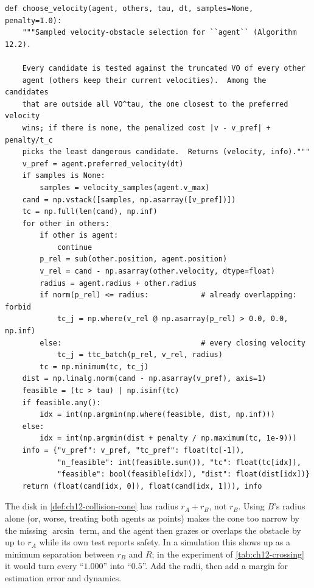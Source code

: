 \begin{lstlisting}[caption={Sampled velocity selection (from \code{code/ch12\_velocity\_obstacles.py}); this is \cref{alg:ch12-choose}.},label={lst:ch12-choose}]
def choose_velocity(agent, others, tau, dt, samples=None, penalty=1.0):
    """Sampled velocity-obstacle selection for ``agent`` (Algorithm 12.2).

    Every candidate is tested against the truncated VO of every other
    agent (others keep their current velocities).  Among the candidates
    that are outside all VO^tau, the one closest to the preferred velocity
    wins; if there is none, the penalized cost |v - v_pref| + penalty/t_c
    picks the least dangerous candidate.  Returns (velocity, info)."""
    v_pref = agent.preferred_velocity(dt)
    if samples is None:
        samples = velocity_samples(agent.v_max)
    cand = np.vstack([samples, np.asarray([v_pref])])
    tc = np.full(len(cand), np.inf)
    for other in others:
        if other is agent:
            continue
        p_rel = sub(other.position, agent.position)
        v_rel = cand - np.asarray(other.velocity, dtype=float)
        radius = agent.radius + other.radius
        if norm(p_rel) <= radius:            # already overlapping: forbid
            tc_j = np.where(v_rel @ np.asarray(p_rel) > 0.0, 0.0, np.inf)
        else:                                # every closing velocity
            tc_j = ttc_batch(p_rel, v_rel, radius)
        tc = np.minimum(tc, tc_j)
    dist = np.linalg.norm(cand - np.asarray(v_pref), axis=1)
    feasible = (tc > tau) | np.isinf(tc)
    if feasible.any():
        idx = int(np.argmin(np.where(feasible, dist, np.inf)))
    else:
        idx = int(np.argmin(dist + penalty / np.maximum(tc, 1e-9)))
    info = {"v_pref": v_pref, "tc_pref": float(tc[-1]),
            "n_feasible": int(feasible.sum()), "tc": float(tc[idx]),
            "feasible": bool(feasible[idx]), "dist": float(dist[idx])}
    return (float(cand[idx, 0]), float(cand[idx, 1])), info
\end{lstlisting}

\begin{pitfall}
The disk in \cref{def:ch12-collision-cone} has radius $r_A + r_B$, not $r_B$.
Using $B$'s radius alone (or, worse, treating both agents as points) makes the
cone too narrow by the missing $\arcsin$ term, and the agent then grazes or
overlaps the obstacle by up to $r_A$ while its own test reports safety. In a
simulation this shows up as a minimum separation between $r_B$ and $R$; in
the experiment of \cref{tab:ch12-crossing} it would turn every ``$1.000$''
into ``$0.5$''. Add the radii, then add a margin for estimation error and
dynamics.
\end{pitfall}

